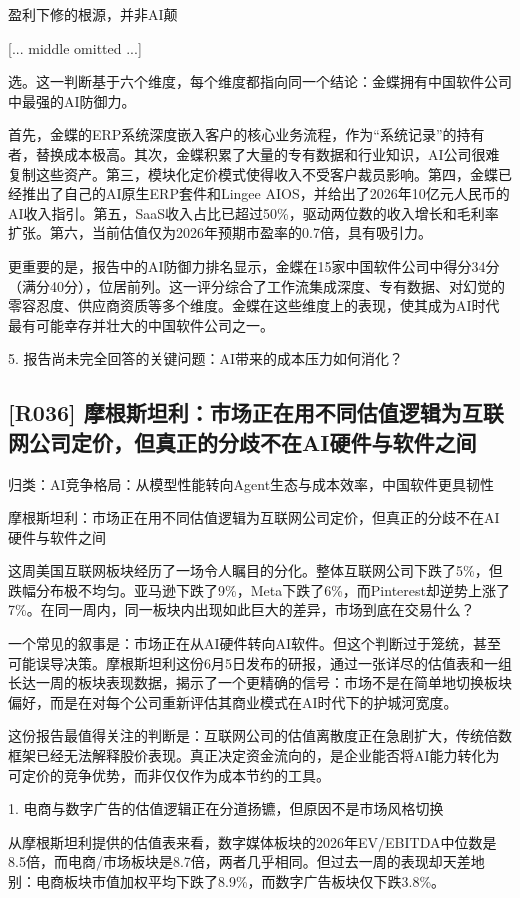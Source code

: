 \documentclass[11pt]{ctexart}
\begin{document}
盈利下修的根源，并非AI颠

[... middle omitted ...]

选。这一判断基于六个维度，每个维度都指向同一个结论：金蝶拥有中国软件公司中最强的AI防御力。

首先，金蝶的ERP系统深度嵌入客户的核心业务流程，作为“系统记录”的持有者，替换成本极高。其次，金蝶积累了大量的专有数据和行业知识，AI公司很难复制这些资产。第三，模块化定价模式使得收入不受客户裁员影响。第四，金蝶已经推出了自己的AI原生ERP套件和Lingee AIOS，并给出了2026年10亿元人民币的AI收入指引。第五，SaaS收入占比已超过50\%，驱动两位数的收入增长和毛利率扩张。第六，当前估值仅为2026年预期市盈率的0.7倍，具有吸引力。

更重要的是，报告中的AI防御力排名显示，金蝶在15家中国软件公司中得分34分（满分40分），位居前列。这一评分综合了工作流集成深度、专有数据、对幻觉的零容忍度、供应商资质等多个维度。金蝶在这些维度上的表现，使其成为AI时代最有可能幸存并壮大的中国软件公司之一。

5. 报告尚未完全回答的关键问题：AI带来的成本压力如何消化？

\subsection{[R036] 摩根斯坦利：市场正在用不同估值逻辑为互联网公司定价，但真正的分歧不在AI硬件与软件之间}
{\small\color{refgray}归类：AI竞争格局：从模型性能转向Agent生态与成本效率，中国软件更具韧性}

摩根斯坦利：市场正在用不同估值逻辑为互联网公司定价，但真正的分歧不在AI硬件与软件之间

这周美国互联网板块经历了一场令人瞩目的分化。整体互联网公司下跌了5\%，但跌幅分布极不均匀。亚马逊下跌了9\%，Meta下跌了6\%，而Pinterest却逆势上涨了7\%。在同一周内，同一板块内出现如此巨大的差异，市场到底在交易什么？

一个常见的叙事是：市场正在从AI硬件转向AI软件。但这个判断过于笼统，甚至可能误导决策。摩根斯坦利这份6月5日发布的研报，通过一张详尽的估值表和一组长达一周的板块表现数据，揭示了一个更精确的信号：市场不是在简单地切换板块偏好，而是在对每个公司重新评估其商业模式在AI时代下的护城河宽度。

这份报告最值得关注的判断是：互联网公司的估值离散度正在急剧扩大，传统倍数框架已经无法解释股价表现。真正决定资金流向的，是企业能否将AI能力转化为可定价的竞争优势，而非仅仅作为成本节约的工具。

1. 电商与数字广告的估值逻辑正在分道扬镳，但原因不是市场风格切换

从摩根斯坦利提供的估值表来看，数字媒体板块的2026年EV/EBITDA中位数是8.5倍，而电商/市场板块是8.7倍，两者几乎相同。但过去一周的表现却天差地别：电商板块市值加权平均下跌了8.9\%，而数字广告板块仅下跌3.8\%。
\end{document}
